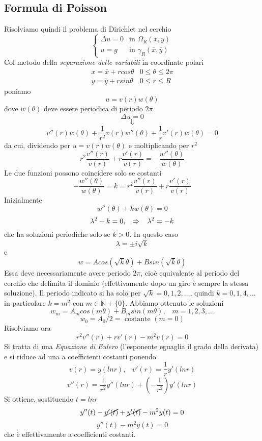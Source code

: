 \subsection{Formula di Poisson}
Risolviamo quindi il problema di Dirichlet nel cerchio
\[
	\left\{
	\begin{array}{ll}
		\Delta u=0 	& \text{in } \Omega_R(\bar{x}, \bar{y}) \\
		u=g 		& \text{in } \gamma_R(\bar{x}, \bar{y})
	\end{array}
	\right.
\]
Col metodo della \textit{separazione delle variabili} in coordinate polari
\[
	\begin{array}{ll}
		x= \bar{x} + rcos \theta & 0 \leq \theta \leq 2 \pi \\
		y= \bar{y} + rsin \theta & 0 \leq r \leq R
	\end{array}
\]
poniamo
\[
	u= v(r)w(\theta)
\]
dove $w(\theta)$ deve essere periodica di periodo $2 \pi$.
\[
	\Delta u = 0
\]
\[
	\Downarrow
\]
\[
	v''(r)w(\theta)+ \frac{1}{r^2}v(r)w''(\theta)+
\frac{1}{r}v'(r)w(\theta)=0
\]
da cui, dividendo per $u= v(r)w(\theta)$ e moltiplicando per $r^2$
\[
	r^2 \frac{ v''(r)}{v(r)} + r \frac{v'(r)}{v(r)}=
	-\frac{w''(\theta)}{w(\theta)}
\]
Le due funzioni possono coincidere solo se costanti
\[
	- \frac{w''(\theta)}{w(\theta)}= k =
	r^2 \frac{ v''(r)}{v(r)} + r \frac{v'(r)}{v(r)}
\]
Inizialmente
\[
	w''(\theta)+ kw(\theta) =0
\]
\[
	\lambda^2 + k=0, \;\;\; \Rightarrow \;\;\; \lambda^2 = -k
\]
che ha soluzioni periodiche solo se $k > 0$.
In questo caso
\[
	\lambda= \pm i\sqrt{k}
\]
e
\[
	w= Acos(\sqrt{k} \theta)+ Bsin(\sqrt{k} \theta)
\]
Essa deve necessariamente avere periodo $2\pi$, cio\`e equivalente al periodo
del cerchio che delimita il dominio (effettivamente dopo un giro \`e sempre
la stessa soluzione).
Il periodo indicato si ha solo per $\sqrt{k}= 0,1,2,\ldots$, quindi
$k= 0,1,4, \ldots$ in particolare $k=m^2$ con $m \in \mathbb{N}+\{0\}$.
Abbiamo ottenuto le soluzioni
\[
	w_m= A_m cos (m\theta)+ B_m sin (m \theta), \;\;\; m=1,2,3,\ldots
\]
\[
	w_0= A_0/2= \text{ costante } (m=0)
\]
Risolviamo ora
\[
	r^2 v''(r)+ rv'(r)- m^2 v(r)=0
\]
Si tratta di una \textit{Equazione di Eulero} (l'esponente eguaglia il grado
della derivata) e si riduce ad una a coefficienti costanti ponendo
\[
	v(r)= y(ln r), \;\;\; v'(r)= \frac{1}{r} y'(ln r)
\]
\[
	v''(r)= \frac{1}{r^2}y''(ln r) + \left( - \frac{1}{r^2} \right)y'(ln r)
\]
Si ottiene, sostituendo $t= ln r$
\[
	y''(t)- \cancel{y'(t)}+ \cancel{y'(t)} - m^2 y(t)=0
\]
\[
	y''(t) - m^2 y(t)=0
\]
che \`e effettivamente a coefficienti costanti.\\
